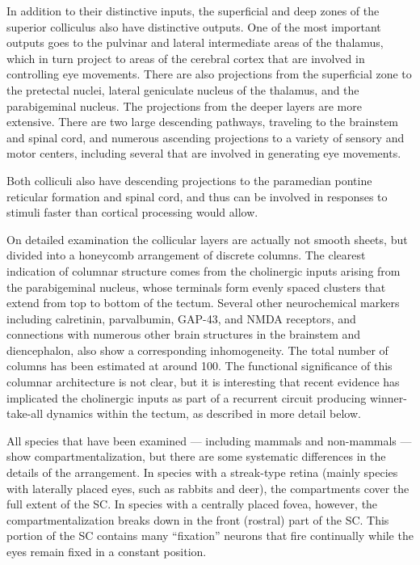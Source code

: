 In addition to their distinctive inputs, the superficial and deep zones of the superior colliculus also have distinctive outputs. One of the most important outputs goes to the pulvinar and lateral intermediate areas of the thalamus, which in turn project to areas of the cerebral cortex that are involved in controlling eye movements. There are also projections from the superficial zone to the pretectal nuclei, lateral geniculate nucleus of the thalamus, and the parabigeminal nucleus. The projections from the deeper layers are more extensive. There are two large descending pathways, traveling to the brainstem and spinal cord, and numerous ascending projections to a variety of sensory and motor centers, including several that are involved in generating eye movements.

Both colliculi also have descending projections to the paramedian pontine reticular formation and spinal cord, and thus can be involved in responses to stimuli faster than cortical processing would allow.

On detailed examination the collicular layers are actually not smooth sheets, but divided into a honeycomb arrangement of discrete columns. The clearest indication of columnar structure comes from the cholinergic inputs arising from the parabigeminal nucleus, whose terminals form evenly spaced clusters that extend from top to bottom of the tectum. Several other neurochemical markers including calretinin, parvalbumin, GAP-43, and NMDA receptors, and connections with numerous other brain structures in the brainstem and diencephalon, also show a corresponding inhomogeneity. The total number of columns has been estimated at around 100. The functional significance of this columnar architecture is not clear, but it is interesting that recent evidence has implicated the cholinergic inputs as part of a recurrent circuit producing winner-take-all dynamics within the tectum, as described in more detail below.

All species that have been examined --- including mammals and non-mammals --- show compartmentalization, but there are some systematic differences in the details of the arrangement. In species with a streak-type retina (mainly species with laterally placed eyes, such as rabbits and deer), the compartments cover the full extent of the SC. In species with a centrally placed fovea, however, the compartmentalization breaks down in the front (rostral) part of the SC. This portion of the SC contains many ``fixation'' neurons that fire continually while the eyes remain fixed in a constant position.


